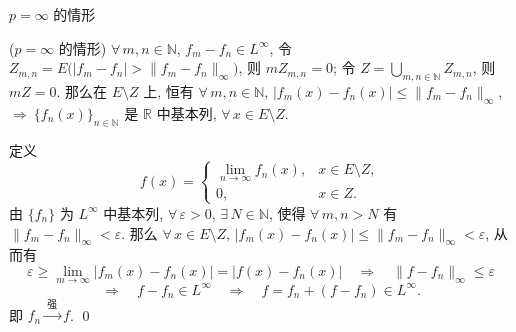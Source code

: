 
\begin{frame}{$p = \infty$ 的情形}

\startproof[bg=yellow, fg=red]($p = \infty$ 的情形)
$\forall\, m, n \in \mathbb{N}$, $f_m - f_n \in L^\infty$, 令
$Z_{m, n} = E \big( |f_m - f_n| > \lVert f_m - f_n \rVert_\infty \big)$, 则
$m Z_{m, n} = 0$; 令 $Z = \bigcup_{m, n \in \mathbb{N}} Z_{m, n}$, 则 $mZ = 0$.
那么在 $E \setminus Z$ 上, 恒有
$\forall\, m, n \in \mathbb{N}$, $|f_m(x) - f_n(x)| \leqslant \lVert f_m - f_n \rVert_\infty$,
$\Longrightarrow\ \{ f_n(x) \}_{n \in \mathbb{N}}$ 是 $\mathbb{R}$ 中基本列, $\forall\, x \in E \setminus Z$.

\pause

定义
\[
f(x) =
\begin{cases}
\lim\limits_{n \to \infty} f_n(x), & x \in E \setminus Z, \\
0, & x \in Z .
\end{cases}
\]
由 $\{ f_n \}$ 为 $L^\infty$ 中基本列, $\forall\, \varepsilon > 0$, $\exists\, N \in \mathbb{N}$,
使得 $\forall\, m, n > N$ 有 $\lVert f_m - f_n \rVert_\infty < \varepsilon$.
那么 $\forall\, x \in E \setminus Z$,
$|f_m(x) - f_n(x)| \leqslant \lVert f_m - f_n \rVert_\infty < \varepsilon$, 从而有
\[
\varepsilon \geqslant \lim_{m \to \infty} |f_m(x) - f_n(x)|
= |f(x) - f_n(x)|
\quad \Longrightarrow \quad
\lVert f - f_n \rVert_\infty \leqslant \varepsilon
\]
\[
\Longrightarrow\quad
f - f_n \in L^\infty
\quad \Longrightarrow \quad
f = f_n + (f - f_n) \in L^\infty .
\]
即 $f_n \xrightarrow{\ \text{强}\ } f$.
\qed

\end{frame}




